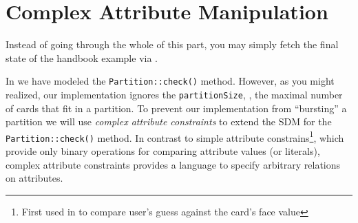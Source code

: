 \newpage
\section{Complex Attribute Manipulation}
\genHeader


Instead of going through the whole of this part, you may simply fetch the final state of the handbook example via .

In  we have modeled the \texttt{Partition::check()} method.
However, as you might realized, our implementation ignores the \texttt{partitionSize}, \idest, the maximal number of cards that fit in a partition.
To prevent our implementation from \enquote{bursting} a partition we will use \emph{complex attribute constraints} to extend the SDM for the \texttt{Partition::check()} method. 
In contrast to simple attribute constrains\footnote{First used in  to compare user’s guess against the card's face value}, which provide only binary operations for comparing attribute values (or literals), complex attribute constraints provides a language to specify arbitrary relations on attributes.

